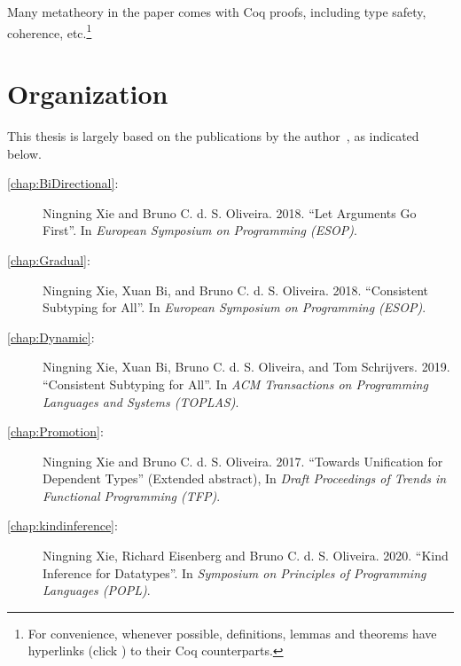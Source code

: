 Many metatheory in the paper comes with Coq proofs, including type safety,
coherence, etc.\footnote{For convenience, whenever possible, definitions, lemmas
  and theorems have hyperlinks (click \leftpointright) to their Coq
  counterparts. }

\section{Organization}

This thesis is largely based on the
publications by the author~\citep{esop2018:arguments,esop2018:consistent,toplas:consistent,popl:kind,tfp},
as indicated below.
\begin{description}
\item[\cref{chap:BiDirectional}:] Ningning Xie and Bruno C. d. S.
  Oliveira. 2018. ``Let Arguments Go First''. In
  \emph{European Symposium on Programming (ESOP)}.
\item[\cref{chap:Gradual}:] Ningning Xie, Xuan Bi, and Bruno C. d. S.
  Oliveira. 2018. ``Consistent Subtyping for All''. In
  \emph{European Symposium on Programming (ESOP)}.
\item[\cref{chap:Dynamic}:] Ningning Xie, Xuan Bi, Bruno C. d. S.
  Oliveira, and Tom Schrijvers. 2019. ``Consistent Subtyping for All''. In
  \emph{ACM Transactions on Programming Languages and Systems (TOPLAS)}.
\item[\cref{chap:Promotion}:]
  Ningning Xie and Bruno C. d. S. Oliveira.
  2017. ``Towards Unification for Dependent Types'' (Extended abstract), In \emph{Draft Proceedings
    of Trends in Functional Programming (TFP)}.
\item[\cref{chap:kindinference}:]
  Ningning Xie, Richard Eisenberg and Bruno C. d. S. Oliveira. 2020. ``Kind
  Inference for Datatypes''. In \emph{Symposium on Principles of Programming
    Languages (POPL)}.
\end{description}


\noindent\makebox[\linewidth]{\rule{0.7\textwidth}{0.4pt}}

\vspace{1.5\baselineskip}



